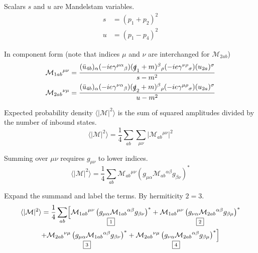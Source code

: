 Scalars $s$ and $u$ are Mandelstam variables.
\begin{align*}
s&=(p_1+p_2)^2
\\
u&=(p_1-p_4)^2
\end{align*}

In component form (note that indices $\mu$ and $\nu$ are interchanged for $\mathcal M_{2ab}$)
\begin{align*}
\mathcal M_{1ab}{}^{\mu\nu}=\frac{
(\bar{u}_{4b})_\alpha
(-ie\gamma^{\mu\alpha}{}_\beta)
(\slashed{q}_1+m)^\beta{}_\rho
(-ie\gamma^{\nu\rho}{}_\sigma)
(u_{2a})^\sigma}{s-m^2}
\\
\mathcal M_{2ab}{}^{\nu\mu}=\frac{
(\bar{u}_{4b})_\alpha
(-ie\gamma^{\nu\alpha}{}_\beta)
(\slashed{q}_2+m)^\beta{}_\rho
(-ie\gamma^{\mu\rho}{}_\sigma)
(u_{2a})^\sigma}{u-m^2}
\end{align*}

Expected probability density $\langle|\mathcal M|^2\rangle$
is the sum of squared amplitudes divided by the number of inbound states.
\begin{equation*}
\langle|\mathcal M|^2\rangle=\frac{1}{4}\sum_{ab}\sum_{\mu\nu}
\bigl|\mathcal M_{ab}{}^{\mu\nu}\bigr|^2
\end{equation*}

Summing over $\mu\nu$ requires $g_{\mu\nu}$ to lower indices.
\begin{equation*}
\langle|\mathcal M|^2\rangle
=\frac{1}{4}\sum_{ab}\mathcal M_{ab}{}^{\mu\nu}
\left(g_{\mu\alpha}\mathcal M_{ab}{}^{\alpha\beta}g_{\beta\nu}\right)^*
\end{equation*}

Expand the summand and label the terms.
By hermiticity $\boxed{\scriptstyle2}=\boxed{\scriptstyle3}$.
\begin{multline*}
\langle|\mathcal{M}|^2\rangle
=\frac{1}{4}\sum_{ab}\Bigl[
\underset{\boxed{\scriptstyle1}}
{\mathcal M_{1ab}{}^{\mu\nu}\left(g_{\mu\alpha}\mathcal M_{1ab}{}^{\alpha\beta}g_{\beta\nu}\right)^*}
+
\underset{\boxed{\scriptstyle2}}
{\mathcal M_{1ab}{}^{\mu\nu}\left(g_{\nu\alpha}\mathcal M_{2ab}{}^{\alpha\beta}g_{\beta\mu}\right)^*}
\\
+
\underset{\boxed{\scriptstyle3}}
{\mathcal M_{2ab}{}^{\nu\mu}\left(g_{\mu\alpha}\mathcal M_{1ab}{}^{\alpha\beta}g_{\beta\nu}\right)^*}
+
\underset{\boxed{\scriptstyle4}}
{\mathcal M_{2ab}{}^{\nu\mu}\left(g_{\nu\alpha}\mathcal M_{2ab}{}^{\alpha\beta}g_{\beta\mu}\right)^*}
\Bigr]
\end{multline*}

